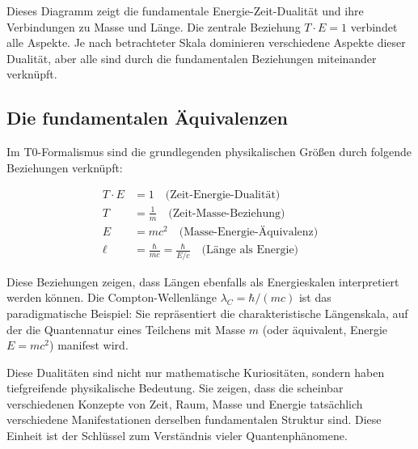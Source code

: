 \documentclass[12pt,a4paper]{article}
\begin{document}
\begin{center}
	\end{center}
	
	Dieses Diagramm zeigt die fundamentale Energie-Zeit-Dualität und ihre Verbindungen zu Masse und Länge. Die zentrale Beziehung $T \cdot E = 1$ verbindet alle Aspekte. Je nach betrachteter Skala dominieren verschiedene Aspekte dieser Dualität, aber alle sind durch die fundamentalen Beziehungen miteinander verknüpft.
	
	\subsection{Die fundamentalen Äquivalenzen}
	
	Im T0-Formalismus sind die grundlegenden physikalischen Größen durch folgende Beziehungen verknüpft:
	
	\begin{align}
		T \cdot E &= 1 \quad \text{(Zeit-Energie-Dualität)} \\
		T &= \frac{1}{m} \quad \text{(Zeit-Masse-Beziehung)} \\
		E &= mc^2 \quad \text{(Masse-Energie-Äquivalenz)} \\
		\ell &= \frac{\hbar}{mc} = \frac{\hbar}{E/c} \quad \text{(Länge als Energie)}
	\end{align}
	
	Diese Beziehungen zeigen, dass Längen ebenfalls als Energieskalen interpretiert werden können. Die Compton-Wellenlänge $\lambda_C = \hbar/(mc)$ ist das paradigmatische Beispiel: Sie repräsentiert die charakteristische Längenskala, auf der die Quantennatur eines Teilchens mit Masse $m$ (oder äquivalent, Energie $E = mc^2$) manifest wird.
	
	Diese Dualitäten sind nicht nur mathematische Kuriositäten, sondern haben tiefgreifende physikalische Bedeutung. Sie zeigen, dass die scheinbar verschiedenen Konzepte von Zeit, Raum, Masse und Energie tatsächlich verschiedene Manifestationen derselben fundamentalen Struktur sind. Diese Einheit ist der Schlüssel zum Verständnis vieler Quantenphänomene.
	
\end{document}
